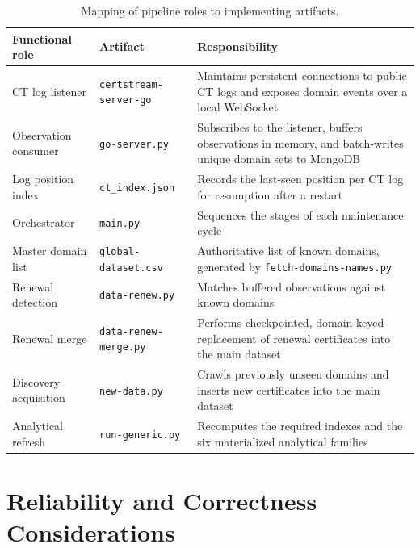 \begin{table}[H]
\centering
\small
\begin{tabularx}{\textwidth}{@{}p{3.2cm} p{4.3cm} X@{}}
\toprule
\textbf{Functional role} & \textbf{Artifact} & \textbf{Responsibility} \\
\midrule

CT log listener &
\texttt{certstream-server-go} &
Maintains persistent connections to public CT logs and exposes domain events over a local WebSocket \\

Observation consumer &
\texttt{go-server.py} &
Subscribes to the listener, buffers observations in memory, and batch-writes unique domain sets to MongoDB \\

Log position index &
\texttt{ct\_index.json} &
Records the last-seen position per CT log for resumption after a restart \\

Orchestrator &
\texttt{main.py} &
Sequences the stages of each maintenance cycle \\

Master domain list &
\texttt{global-dataset.csv} &
Authoritative list of known domains, generated by \texttt{fetch-domains-names.py} \\

Renewal detection &
\texttt{data-renew.py} &
Matches buffered observations against known domains \\

Renewal merge &
\texttt{data-renew-merge.py} &
Performs checkpointed, domain-keyed replacement of renewal certificates into the main dataset \\

Discovery acquisition &
\texttt{new-data.py} &
Crawls previously unseen domains and inserts new certificates into the main dataset\\

Analytical refresh &
\texttt{run-generic.py} &
Recomputes the required indexes and the six materialized analytical families \\

\bottomrule
\end{tabularx}
\caption{Mapping of pipeline roles to implementing artifacts.}
\label{tab:ct-components}
\end{table}

\renewcommand{\arraystretch}{1}


\section{Reliability and Correctness Considerations}
\label{sec:ct-failure-limitations}

